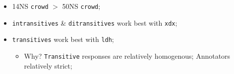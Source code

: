 \documentclass[handout,xcolor={dvipsnames}]{beamer}
\newcommand{\param}[1]{\texttt{#1}}
\begin{document}
\begin{frame}
\begin{itemize}
\pause
\item 14NS \param{crowd} $>$ 50NS \param{crowd};
\pause
\item \param{intransitives} \& \param{ditransitives} work best with \param{xdx};
\pause
\item \param{transitives} work best with \param{ldh};
\begin{itemize}
\pause
\item Why? \param{Transitive} responses are relatively homogenous; Annotators relatively strict;
\end{itemize}
\end{itemize}

\end{frame}

\end{document}
